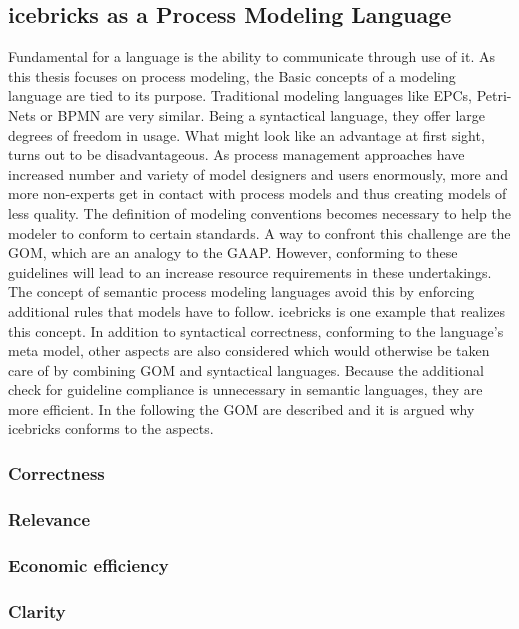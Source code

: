 		\subsection{icebricks as a Process Modeling Language}
		
	 Fundamental for a language is the ability to communicate through use of it. As this thesis focuses on process modeling, the  Basic concepts of a modeling language are tied to its purpose. Traditional modeling languages like EPCs, Petri-Nets or BPMN are very similar. Being a syntactical language, they offer large degrees of freedom in usage. What might look like an advantage at first sight, turns out to be disadvantageous. As process management approaches have increased number and variety of model designers and users enormously, more and more non-experts get in contact with process models and thus creating models of less quality. The definition of modeling conventions becomes necessary to help the modeler to conform to certain standards. A way to confront this challenge are the \acrfull{GOM}, which are an analogy to the \acrfull{GAAP}. However, conforming to these guidelines will lead to an increase resource requirements in these undertakings. The concept of semantic process modeling languages avoid this by enforcing additional rules that models have to follow. icebricks is one example that realizes this concept. In addition to syntactical correctness, \ie conforming to the language's meta model, other aspects are also considered which would otherwise be taken care of by combining \acrshort{GOM} and syntactical languages. Because the additional check for guideline compliance is unnecessary in semantic languages, they are more efficient. In the following the \acrshort{GOM} are described and it is argued why icebricks conforms to the aspects. 
	 
	 \subsubsection{Correctness}
	 
	 \subsubsection{Relevance}
	 
	 \subsubsection{Economic efficiency}
	 
	 \subsubsection{Clarity}
	 
